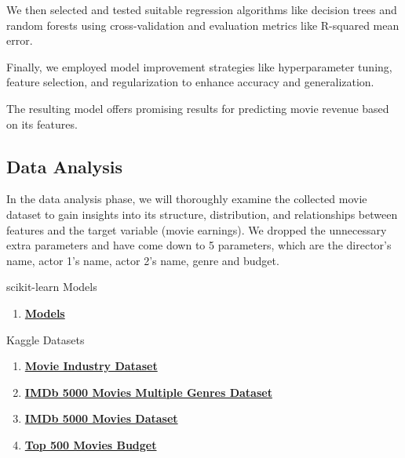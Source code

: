 \documentclass[conference]{IEEEtran}
\begin{document}
    We then selected and tested suitable regression algorithms like decision trees and random forests using cross-validation and evaluation metrics like R-squared mean error.
    
    Finally, we employed model improvement strategies like hyperparameter tuning, feature selection, and regularization to enhance accuracy and generalization.
    
    The resulting model offers promising results for predicting movie revenue based on its features.

    \subsection{Data Analysis}
    In the data analysis phase, we will thoroughly examine the collected movie dataset to gain insights into its structure, distribution, and relationships between features and the target variable (movie earnings). We dropped the unnecessary extra parameters and have come down to 5 parameters, which are the director's name, actor 1's name, actor 2's name, genre and budget.

\begin{thebibliography}{1}
     scikit-learn Models 
    \begin{enumerate}
        \item \href{https://scikit-learn.org/stable/supervised_learning.html#supervised-learning}{\textbf{Models}}
    \end{enumerate}

     Kaggle Datasets 
    \begin{enumerate}
        \item \href{https://www.kaggle.com/datasets/danielgrijalvas/movies}{\textbf{Movie Industry Dataset}}
        \item \href{https://www.kaggle.com/datasets/rakkesharv/imdb-5000-movies-multiple-genres-dataset}{\textbf{IMDb 5000 Movies Multiple Genres Dataset}}
        \item \href{https://www.kaggle.com/datasets/carolzhangdc/imdb-5000-movie-dataset}{\textbf{IMDb 5000 Movies Dataset}}
        \item \href{https://www.kaggle.com/datasets/mitchellharrison/top-500-movies-budget}{\textbf{Top 500 Movies Budget}}
    \end{enumerate}
\end{thebibliography}
\end{document}
